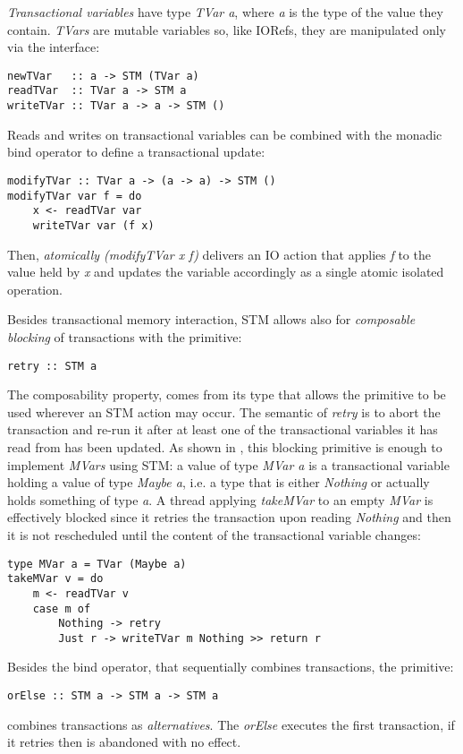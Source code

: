 \emph{Transactional variables} have type \emph{TVar a}, where \emph{a} is the type of the value they contain. \emph{TVars} are mutable variables so, like IORefs, they are manipulated only via the interface:
\begin{lstlisting}
newTVar   :: a -> STM (TVar a)
readTVar  :: TVar a -> STM a
writeTVar :: TVar a -> a -> STM ()
\end{lstlisting}

Reads and writes on transactional variables can be combined with the monadic bind operator to define a transactional update:

\begin{lstlisting}
modifyTVar :: TVar a -> (a -> a) -> STM ()
modifyTVar var f = do
    x <- readTVar var
    writeTVar var (f x)
\end{lstlisting}

Then, \emph{atomically (modifyTVar x f)} delivers an IO action that applies \emph{f} to the value held by \emph{x} and updates the variable accordingly as a single atomic isolated operation.

Besides transactional memory interaction, STM allows also for \emph{composable blocking} of transactions with the primitive:

\begin{lstlisting}
retry :: STM a
\end{lstlisting}

The composability property, comes from its type that allows the primitive to be used wherever an STM action may occur.
The semantic of \emph{retry} is to abort the transaction and re-run it after at least one of the transactional variables it has read from has been updated.
As shown in \cite{Harris:2005:CMT:1065944.1065952}, this blocking primitive is enough to implement \emph{MVars} using STM: a value of type \emph{MVar a} is a transactional variable holding a value of type \emph{Maybe a}, i.e. a type that is either \emph{Nothing} or actually holds something of type \emph{a}. A thread applying \emph{takeMVar} to an empty \emph{MVar} is effectively blocked since it retries the transaction upon reading \emph{Nothing} and then it is not rescheduled until the content of the transactional variable changes:

\begin{lstlisting}
type MVar a = TVar (Maybe a)
takeMVar v = do
    m <- readTVar v
    case m of
        Nothing -> retry
        Just r -> writeTVar m Nothing >> return r
\end{lstlisting}

Besides the bind operator, that sequentially combines transactions, the primitive:
\begin{lstlisting}
orElse :: STM a -> STM a -> STM a
\end{lstlisting}
combines transactions as \emph{alternatives}. The \emph{orElse} executes the first transaction, if it retries then is abandoned with no effect.
